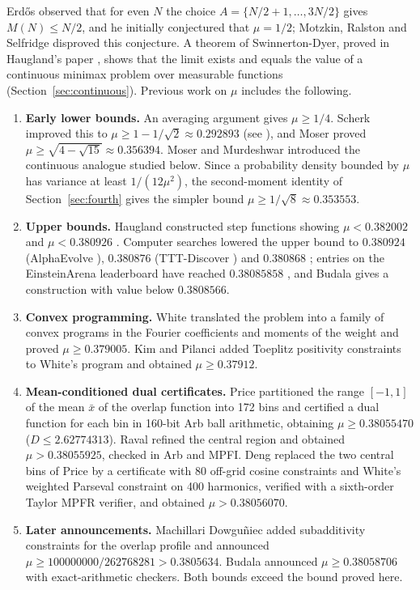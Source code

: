\documentclass[11pt,a4paper]{article}
\theoremstyle{definition}
\theoremstyle{remark}
\begin{document}
Erd\H{o}s observed that for even $N$ the choice $A = \{N/2+1, \dots, 3N/2\}$ gives $M(N) \le N/2$, and he initially conjectured that $\mu = 1/2$; Motzkin, Ralston and Selfridge \cite{motzkin1956} disproved this conjecture. A theorem of Swinnerton-Dyer, proved in Haugland's paper \cite{haugland1996}, shows that the limit exists and equals the value of a continuous minimax problem over measurable functions (Section~\ref{sec:continuous}). Previous work on $\mu$ includes the following.
\begin{enumerate}
\item \textbf{Early lower bounds.} An averaging argument gives $\mu \ge 1/4$. Scherk improved this to $\mu \ge 1 - 1/\sqrt{2} \approx 0.292893$ (see \cite{moser1959}), and Moser \cite{moser1959} proved $\mu \ge \sqrt{4 - \sqrt{15}} \approx 0.356394$. Moser and Murdeshwar \cite{mosermurdeshwar1966} introduced the continuous analogue studied below. Since a probability density bounded by $\mu$ has variance at least $1/(12\mu^2)$, the second-moment identity of Section~\ref{sec:fourth} gives the simpler bound $\mu \ge 1/\sqrt{8} \approx 0.353553$.
\item \textbf{Upper bounds.} Haugland constructed step functions showing $\mu < 0.382002$ \cite{haugland1996} and $\mu < 0.380926$ \cite{haugland2016}. Computer searches lowered the upper bound to $0.380924$ (AlphaEvolve \cite{alphaevolve2025}), $0.380876$ (TTT-Discover \cite{tttdiscover2026}) and $0.380868$ \cite{simpletes2026}; entries on the EinsteinArena leaderboard \cite{einsteinarena2026} have reached $0.38085858$ \cite{erdosproblems36}, and Budala \cite{budala2026} gives a construction with value below $0.3808566$.
\item \textbf{Convex programming.} White \cite{white2022, white2023} translated the problem into a family of convex programs in the Fourier coefficients and moments of the weight and proved $\mu \ge 0.379005$. Kim and Pilanci \cite{kimpilanci2026} added Toeplitz positivity constraints to White's program and obtained $\mu \ge 0.37912$.
\item \textbf{Mean-conditioned dual certificates.} Price \cite{price2026} partitioned the range $[-1, 1]$ of the mean $\bar{x}$ of the overlap function into 172 bins and certified a dual function for each bin in 160-bit Arb ball arithmetic, obtaining $\mu \ge 0.38055470$ ($D \le 2.62774313$). Raval \cite{raval2026} refined the central region and obtained $\mu > 0.38055925$, checked in Arb and MPFI. Deng \cite{deng2026} replaced the two central bins of Price by a certificate with 80 off-grid cosine constraints and White's weighted Parseval constraint on 400 harmonics, verified with a sixth-order Taylor MPFR verifier, and obtained $\mu > 0.38056070$.
\item \textbf{Later announcements.} Machillari Dowgu\~{n}iec \cite{machillari2026} added subadditivity constraints for the overlap profile and announced $\mu \ge 100000000/262768281 > 0.3805634$. Budala \cite{budala2026} announced $\mu \ge 0.38058706$ with exact-arithmetic checkers. Both bounds exceed the bound proved here.
\end{enumerate}
\end{document}
